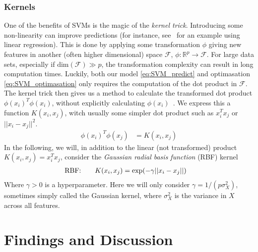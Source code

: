             \subsubsection{Kernels}
                One of the benefits of SVMs is the magic of the \textit{kernel trick}. Introducing some non-linearity can improve predictions (for instance, see~\citep{Project1} for an example using linear regression). This is done by applying some transformation $\phi$ giving new features in another (often higher dimensional) space $\mathcal{F}$, $\phi: \mathbb{R}^p \xrightarrow{} \mathcal{F}$. For large data sets, especially if $\text{dim}(\mathcal{F}) \gg p$, the transformation complexity can result in long computation times. Luckily, both our model \cref{eq:SVM_predict} and optimasation \cref{eq:SVM_optimasation} only requires the computation of the dot product in $\mathcal{F}$. The kernel trick then gives us a method to calculate the transformed dot product $\phi(x_i)^T \phi(x_i)$, without explicitly calculating $\phi(x_i)$~\citep{kernelTrick}. We express this a function $K(x_i, x_j)$, witch usually some simpler dot product such as $x_i^T x_j$ or $||x_i - x_j||^2$.      
                \begin{align*}
                    \phi(x_i)^T \phi(x_j) &= K(x_i, x_j)
                \end{align*}
                In the following, we will, in addition to the linear (not transformed) product $K(x_i, x_j) = x_i^T x_j$, consider the \textit{Gaussian radial basis function} (RBF) kernel
                \begin{align}
                    \text{RBF:}\hspace{20px}& K(x_i, x_j) = \text{exp}(-\gamma ||x_i - x_j||)
                \end{align}
                Where $\gamma > 0$ is a hyperparameter. Here we will only consider $\gamma = 1/(p\sigma_X^2)$, sometimes simply called the Gaussian kernel, where $\sigma_X^2$ is the variance in $X$ across all features. 

    \section{Findings and Discussion}

